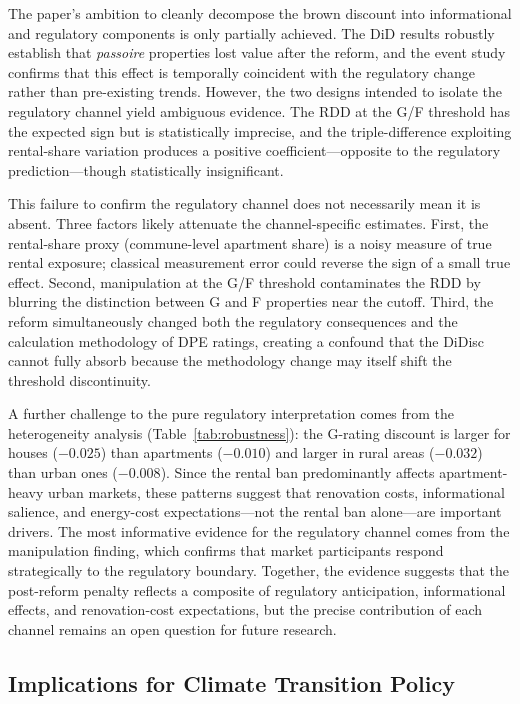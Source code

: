 \documentclass[12pt]{article}
\begin{document}
The paper's ambition to cleanly decompose the brown discount into informational and regulatory components is only partially achieved. The DiD results robustly establish that \textit{passoire} properties lost value after the reform, and the event study confirms that this effect is temporally coincident with the regulatory change rather than pre-existing trends. However, the two designs intended to isolate the regulatory channel yield ambiguous evidence. The RDD at the G/F threshold has the expected sign but is statistically imprecise, and the triple-difference exploiting rental-share variation produces a positive coefficient---opposite to the regulatory prediction---though statistically insignificant.

This failure to confirm the regulatory channel does not necessarily mean it is absent. Three factors likely attenuate the channel-specific estimates. First, the rental-share proxy (commune-level apartment share) is a noisy measure of true rental exposure; classical measurement error could reverse the sign of a small true effect. Second, manipulation at the G/F threshold contaminates the RDD by blurring the distinction between G and F properties near the cutoff. Third, the reform simultaneously changed both the regulatory consequences and the calculation methodology of DPE ratings, creating a confound that the DiDisc cannot fully absorb because the methodology change may itself shift the threshold discontinuity.

A further challenge to the pure regulatory interpretation comes from the heterogeneity analysis (Table~\ref{tab:robustness}): the G-rating discount is larger for houses ($-0.025$) than apartments ($-0.010$) and larger in rural areas ($-0.032$) than urban ones ($-0.008$). Since the rental ban predominantly affects apartment-heavy urban markets, these patterns suggest that renovation costs, informational salience, and energy-cost expectations---not the rental ban alone---are important drivers. The most informative evidence for the regulatory channel comes from the manipulation finding, which confirms that market participants respond strategically to the regulatory boundary. Together, the evidence suggests that the post-reform penalty reflects a composite of regulatory anticipation, informational effects, and renovation-cost expectations, but the precise contribution of each channel remains an open question for future research.

\subsection{Implications for Climate Transition Policy}
\end{document}
